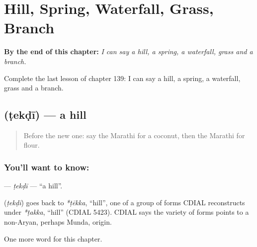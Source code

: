 
\chapter{Hill, Spring, Waterfall, Grass, Branch}
\label{ch:mr-hill-spring-waterfall-grass-branch}

\begin{chapteropening}
\textbf{By the end of this chapter:} \emph{I can say a hill, a spring, a waterfall, grass and a branch.}

Complete the last lesson of chapter 139: I can say a hill, a spring, a waterfall, grass and a branch.
\end{chapteropening}

\section[\texorpdfstring{\mr{टेकडी} (ṭekḍī)}{टेकडी (ṭekḍī)}]{ (ṭekḍī) — a hill}

\label{lesson:MR-C139-tekdi}



\begin{quote}
Before the new one: say the Marathi for a coconut, then the Marathi for flour.
\end{quote}

\subsection*{You'll want to know: }
\textbf{} — \emph{ṭekḍī} — \textquotedblleft{}a hill\textquotedblright{}.

\begin{cousinweb}
\textbf{} (\emph{ṭekḍī}) goes back to \emph{*ṭēkka}, \textquotedblleft{}hill\textquotedblright{}, one of a group of forms CDIAL reconstructs under \emph{*ṭakka}, \textquotedblleft{}hill\textquotedblright{} (CDIAL 5423). CDIAL says the variety of forms points to a non-Aryan, perhaps Munda, origin.
\end{cousinweb}

\begin{grammarlens}[title={What you've built}]
One more word for this chapter.
\end{grammarlens}

